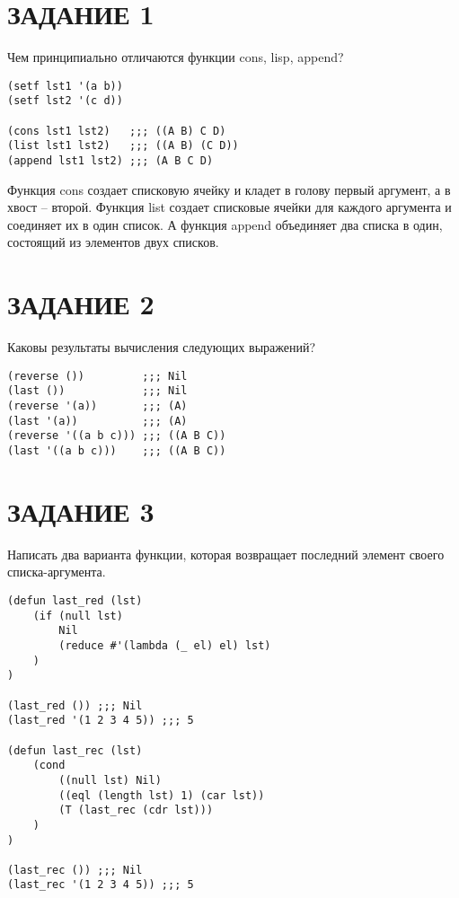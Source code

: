 \section{ЗАДАНИЕ 1}

Чем принципиально отличаются функции cons, lisp, append?

\begin{lstlisting}
(setf lst1 '(a b))
(setf lst2 '(c d))

(cons lst1 lst2)   ;;; ((A B) C D)
(list lst1 lst2)   ;;; ((A B) (C D))
(append lst1 lst2) ;;; (A B C D)
\end{lstlisting}

Функция cons создает списковую ячейку и кладет в голову первый аргумент, а в хвост --
второй. Функция list создает списковые ячейки для каждого аргумента и соединяет
их в один список. А функция append объединяет два списка в один, состоящий из
элементов двух списков.

\section{ЗАДАНИЕ 2}

Каковы результаты вычисления следующих выражений?

\begin{lstlisting}
(reverse ())         ;;; Nil
(last ())            ;;; Nil
(reverse '(a))       ;;; (A)
(last '(a))          ;;; (A)
(reverse '((a b c))) ;;; ((A B C))
(last '((a b c)))    ;;; ((A B C))
\end{lstlisting}

\section{ЗАДАНИЕ 3}

Написать два варианта функции, которая возвращает последний элемент своего
списка-аргумента.

\begin{lstlisting}
(defun last_red (lst)
    (if (null lst)
        Nil
        (reduce #'(lambda (_ el) el) lst)
    )
)

(last_red ()) ;;; Nil
(last_red '(1 2 3 4 5)) ;;; 5

(defun last_rec (lst)
    (cond
        ((null lst) Nil)
        ((eql (length lst) 1) (car lst))
        (T (last_rec (cdr lst)))
    )
)

(last_rec ()) ;;; Nil
(last_rec '(1 2 3 4 5)) ;;; 5
\end{lstlisting}

